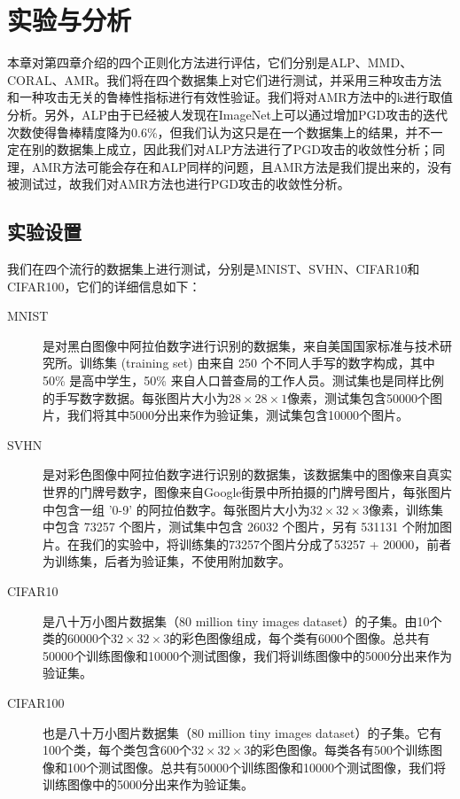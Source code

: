 \chapter{实验与分析}

本章对第四章介绍的四个正则化方法进行评估，它们分别是ALP、MMD、CORAL、AMR。我们将在四个数据集上对它们进行测试，并采用三种攻击方法和一种攻击无关的鲁棒性指标进行有效性验证。我们将对AMR方法中的k进行取值分析。另外，ALP由于已经被人发现在ImageNet上可以通过增加PGD攻击的迭代次数使得鲁棒精度降为0.6\%\cite{engstrom2018evaluating}，但我们认为这只是在一个数据集上的结果，并不一定在别的数据集上成立，因此我们对ALP方法进行了PGD攻击的收敛性分析；同理，AMR方法可能会存在和ALP同样的问题，且AMR方法是我们提出来的，没有被测试过，故我们对AMR方法也进行PGD攻击的收敛性分析。

\section{实验设置}

我们在四个流行的数据集上进行测试，分别是MNIST\cite{lecun1998mnist}、SVHN\cite{netzer2011reading}、CIFAR10和CIFAR100\cite{krizhevsky2009learning}，它们的详细信息如下：
\begin{description}
    \item[MNIST] 是对黑白图像中阿拉伯数字进行识别的数据集，来自美国国家标准与技术研究所。训练集 (training set) 由来自 250 个不同人手写的数字构成，其中 50\% 是高中学生，50\% 来自人口普查局的工作人员。测试集也是同样比例的手写数字数据。每张图片大小为$28\times28\times1$像素，测试集包含50000个图片，我们将其中5000分出来作为验证集，测试集包含10000个图片。
    \item[SVHN] 是对彩色图像中阿拉伯数字进行识别的数据集，该数据集中的图像来自真实世界的门牌号数字，图像来自Google街景中所拍摄的门牌号图片，每张图片中包含一组 '0-9' 的阿拉伯数字。每张图片大小为$32\times32\times3$像素，训练集中包含 73257 个图片，测试集中包含 26032 个图片，另有 531131 个附加图片。在我们的实验中，将训练集的73257个图片分成了53257 + 20000，前者为训练集，后者为验证集，不使用附加数字。
    \item[CIFAR10] 是八十万小图片数据集（80 million tiny images dataset）的子集。由10个类的60000个$32\times32\times3$的彩色图像组成，每个类有6000个图像。总共有50000个训练图像和10000个测试图像，我们将训练图像中的5000分出来作为验证集。
    \item[CIFAR100] 也是八十万小图片数据集（80 million tiny images dataset）的子集。它有100个类，每个类包含600个$32\times32\times3$的彩色图像。每类各有500个训练图像和100个测试图像。总共有50000个训练图像和10000个测试图像，我们将训练图像中的5000分出来作为验证集。
\end{description} 

